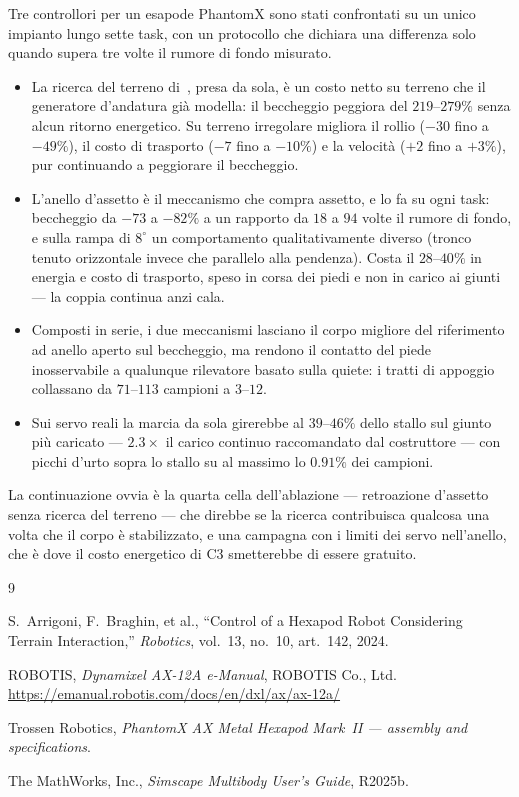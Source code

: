 \documentclass[11pt,a4paper]{article}
\newcommand{\Cth}{\textsf{C3}}
\begin{document}
Tre controllori per un esapode PhantomX sono stati confrontati su un unico
impianto lungo sette task, con un protocollo che dichiara una differenza solo
quando supera tre volte il rumore di fondo misurato.

\begin{itemize}
\item La ricerca del terreno di~\cite{arrigoni2024}, presa da sola, \`e un costo
netto su terreno che il generatore d'andatura gi\`a modella: il beccheggio
peggiora del $219$--$279\%$ senza alcun ritorno energetico. Su terreno
irregolare migliora il rollio ($-30$ fino a $-49\%$), il costo di trasporto
($-7$ fino a $-10\%$) e la velocit\`a ($+2$ fino a $+3\%$), pur continuando a
peggiorare il beccheggio.
\item L'anello d'assetto \`e il meccanismo che compra assetto, e lo fa su ogni
task: beccheggio da $-73$ a $-82\%$ a un rapporto da $18$ a $94$ volte il
rumore di fondo, e sulla rampa di $8^\circ$ un comportamento qualitativamente
diverso (tronco tenuto orizzontale invece che parallelo alla pendenza). Costa
il $28$--$40\%$ in energia e costo di trasporto, speso in corsa dei piedi e non
in carico ai giunti --- la coppia continua anzi cala.
\item Composti in serie, i due meccanismi lasciano il corpo migliore del
riferimento ad anello aperto sul beccheggio, ma rendono il contatto del piede
inosservabile a qualunque rilevatore basato sulla quiete: i tratti di appoggio
collassano da $71$--$113$ campioni a $3$--$12$.
\item Sui servo reali la marcia da sola girerebbe al $39$--$46\%$ dello stallo
sul giunto pi\`u caricato --- $2.3\times$ il carico continuo raccomandato dal
costruttore --- con picchi d'urto sopra lo stallo su al massimo lo $0.91\%$ dei
campioni.
\end{itemize}

La continuazione ovvia \`e la quarta cella dell'ablazione --- retroazione
d'assetto senza ricerca del terreno --- che direbbe se la ricerca contribuisca
qualcosa una volta che il corpo \`e stabilizzato, e una campagna con i limiti
dei servo nell'anello, che \`e dove il costo energetico di \Cth{} smetterebbe di
essere gratuito.

\begin{thebibliography}{9}

S.~Arrigoni, F.~Braghin, et al.,
``Control of a Hexapod Robot Considering Terrain Interaction,''
\emph{Robotics}, vol.~13, no.~10, art.~142, 2024.

ROBOTIS, \emph{Dynamixel AX-12A e-Manual}, ROBOTIS Co., Ltd.
\url{https://emanual.robotis.com/docs/en/dxl/ax/ax-12a/}

Trossen Robotics, \emph{PhantomX AX Metal Hexapod Mark~II --- assembly and
specifications}.

The MathWorks, Inc., \emph{Simscape Multibody User's Guide}, R2025b.

\end{thebibliography}
\end{document}
